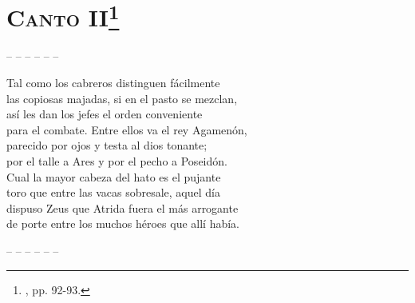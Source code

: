 \section*{\centering\textbf{\textsc{Canto} II}\footnote{\neh, pp. 92-93.}}
%
\noindent-- -- -- -- -- --\par
%
\beginnumbering
\pstart
{}Tal como los cabreros distinguen fácilmente\\
las copiosas majadas, si en el pasto se mezclan,\\
así les dan los jefes el orden conveniente\\
para el combate. Entre ellos va el rey Agamenón,\\
parecido por ojos y testa al dios tonante;\\
por el talle a Ares y por el pecho a Poseidón.\\
Cual la mayor cabeza del hato es el pujante\\
toro que entre las vacas sobresale, aquel día\\
dispuso Zeus que Atrida fuera el más arrogante\\
de porte entre los muchos héroes que allí había.\par
\pend
\endnumbering
%
\noindent-- -- -- -- -- --\par